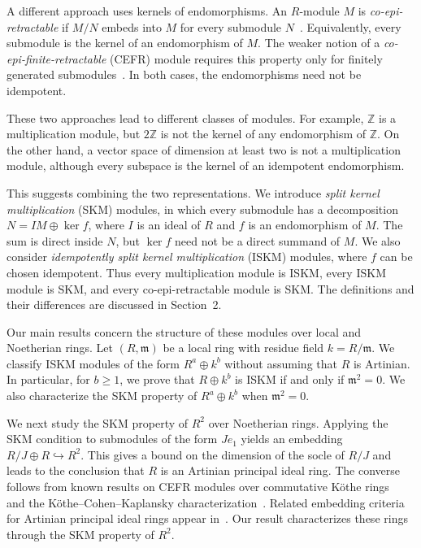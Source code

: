 \documentclass[11pt,a4paper]{article}
\theoremstyle{definition}
\theoremstyle{remark}
\begin{document}
A different approach uses kernels of endomorphisms. An $R$-module $M$ is \emph{co-epi-retractable} if $M/N$ embeds into $M$ for every submodule $N$~\cite{Ghorbani}. Equivalently, every submodule is the kernel of an endomorphism of $M$. The weaker notion of a \emph{co-epi-finite-retractable} (CEFR) module requires this property only for finitely generated submodules~\cite{Neishabouri}. In both cases, the endomorphisms need not be idempotent.

These two approaches lead to different classes of modules. For example, $\mathbb Z$ is a multiplication module, but $2\mathbb Z$ is not the kernel of any endomorphism of $\mathbb Z$. On the other hand, a vector space of dimension at least two is not a multiplication module, although every subspace is the kernel of an idempotent endomorphism.

This suggests combining the two representations. We introduce \emph{split kernel multiplication} (SKM) modules, in which every submodule has a decomposition $N=IM\oplus\ker f$, where $I$ is an ideal of $R$ and $f$ is an endomorphism of $M$. The sum is direct inside $N$, but $\ker f$ need not be a direct summand of $M$. We also consider \emph{idempotently split kernel multiplication} (ISKM) modules, where $f$ can be chosen idempotent. Thus every multiplication module is ISKM, every ISKM module is SKM, and every co-epi-retractable module is SKM. The definitions and their differences are discussed in Section~2.

Our main results concern the structure of these modules over local and Noetherian rings. Let $(R,\mathfrak m)$ be a local ring with residue field $k=R/\mathfrak m$. We classify ISKM modules of the form $R^a\oplus k^b$ without assuming that $R$ is Artinian. In particular, for $b\geq1$, we prove that $R\oplus k^b$ is ISKM if and only if $\mathfrak m^2=0$. We also characterize the SKM property of $R^a\oplus k^b$ when $\mathfrak m^2=0$.

We next study the SKM property of $R^2$ over Noetherian rings. Applying the SKM condition to submodules of the form $Je_1$ yields an embedding $R/J\oplus R\hookrightarrow R^2$. This gives a bound on the dimension of the socle of $R/J$ and leads to the conclusion that $R$ is an Artinian principal ideal ring. The converse follows from known results on CEFR modules over commutative K\"othe rings~\cite{Neishabouri} and the K\"othe--Cohen--Kaplansky characterization~\cite{Baghdari}. Related embedding criteria for Artinian principal ideal rings appear in~\cite{Alvarado2019,Cejudo2025}. Our result characterizes these rings through the SKM property of $R^2$.
\end{document}
